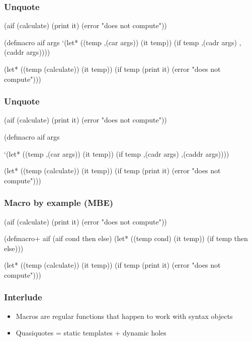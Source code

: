 \documentclass[hyperref={bookmarks=false}]{beamer}
\begin{document}
\begin{frame}[fragile]
\frametitle{Unquote}
\begin{semiverbatim}
(aif (calculate)
  (print it)
  (error "does not compute"))

(defmacro aif args
  \alert{     `}(let*            ((temp \alert{,(car args)})
                          (it  temp))
          (if  temp
            \alert{,(cadr args)}
            \alert{,(caddr args)})))

(let* ((temp (calculate))
       (it temp))
  (if temp
    (print it)
    (error "does not compute")))
\end{semiverbatim}
\end{frame}

\begin{frame}[fragile]
\frametitle{Unquote}
\begin{semiverbatim}
(aif (calculate)
  (print it)
  (error "does not compute"))

(defmacro  aif args

 `(let* ((temp ,(car args))
         (it temp))
    (if temp
        ,(cadr args)
        ,(caddr args))))

(let* ((temp (calculate))
       (it temp))
  (if temp
    (print it)
    (error "does not compute")))
\end{semiverbatim}
\end{frame}

\begin{frame}[fragile]
\frametitle{Macro by example (MBE)}
\begin{semiverbatim}
(aif (calculate)
  (print it)
  (error "does not compute"))

(defmacro+ aif
  \alert{(aif cond then else)}
  (let* ((temp \alert{cond})
         (it temp))
    (if temp
        \alert{then}
        \alert{else})))

(let* ((temp (calculate))
       (it temp))
  (if temp
    (print it)
    (error "does not compute")))
\end{semiverbatim}
\end{frame}

\begin{frame}[fragile]
\frametitle{Interlude}
\begin{itemize}
\item Macros are regular functions that happen to work with syntax objects
\item Quasiquotes = static templates + dynamic holes
\end{itemize}
\end{frame}
\end{document}
